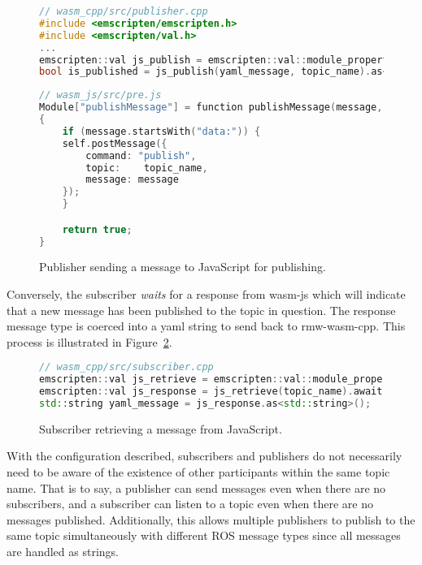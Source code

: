         \begin{figure}[htbp]
            \centering
            \begin{lstlisting}[language=C++]
// wasm_cpp/src/publisher.cpp
#include <emscripten/emscripten.h>
#include <emscripten/val.h>
...
emscripten::val js_publish = emscripten::val::module_property("publishMessage");
bool is_published = js_publish(yaml_message, topic_name).as<bool>();
\end{lstlisting}

            \begin{lstlisting}[language=C++] 
// wasm_js/src/pre.js
Module["publishMessage"] = function publishMessage(message, topic_name)
{
    if (message.startsWith("data:")) {
    self.postMessage({
        command: "publish",
        topic:    topic_name,
        message: message
    });
    }

    return true;
}
\end{lstlisting}
            \caption{Publisher sending a message to JavaScript for publishing.}
            \label{fig:publish}
        \end{figure}

    Conversely, the subscriber \textit{waits} for a response from \textsf{wasm-js} which will indicate that a new message has been published to the topic in question. The response message type is coerced into a yaml string to send back to \textsf{rmw-wasm-cpp}. This process is illustrated in Figure~\ref{fig:retrieve}.

    \begin{figure}[htbp]
        \centering
        \begin{lstlisting}[language=C++]
// wasm_cpp/src/subscriber.cpp
emscripten::val js_retrieve = emscripten::val::module_property("retrieveMessage");
emscripten::val js_response = js_retrieve(topic_name).await();
std::string yaml_message = js_response.as<std::string>();
\end{lstlisting}    
        \caption{Subscriber retrieving a message from JavaScript.}
        \label{fig:retrieve}
    \end{figure}

    With the configuration described, subscribers and publishers do not necessarily need to be aware of the existence of other participants within the same topic name. That is to say, a publisher can send messages even when there are no subscribers, and a subscriber can listen to a topic even when there are no messages published. Additionally, this allows multiple publishers to publish to the same topic simultaneously with different \ac{ROS} message types since all messages are handled as strings.

